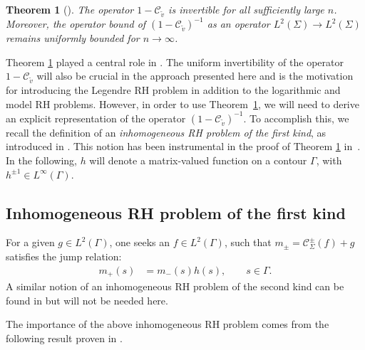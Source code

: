 \documentclass[11pt]{article}
\numberwithin{equation}{section}
\newcommand{\tv}{{\widetilde v}}
\newcommand{\Cau}{\mathcal C_{\Sigma}}
\newcommand{\Cautv}{\mathcal C_{\tv}}
\newcommand{\Ltwo}{L^2(\Sigma)}
\newtheorem{Theorem}{Theorem}[section]
\numberwithin{equation}{section}
\begin{document}
\begin{Theorem}[{\cite[Theorem 4.5]{CD}}]\label{UnifLeg}
The operator $1-\Cautv$ is invertible for all sufficiently large $n$. Moreover, the operator bound of $(1-\Cautv)^{-1}$ as an operator $\Ltwo \to \Ltwo$ remains uniformly bounded for $n \to \infty$.
\end{Theorem}
Theorem \ref{UnifLeg} played a central role in \cite{CD}. The uniform invertibility of the operator $1-\Cautv$ will also be crucial in the approach presented here and is the motivation for introducing the Legendre RH problem in addition to the logarithmic and model RH problems. However, in order to use Theorem~\ref{UnifLeg}, we will need to derive an explicit representation of the operator $(1-\Cautv)^{-1}$. To accomplish this, we recall the definition of an \emph{inhomogeneous RH problem of the first kind}, as introduced in \cite[Section~2.6]{DZSob}. This notion has been instrumental in the proof of Theorem \ref{UnifLeg} in~\cite{CD}. In the following, $h$ will denote a matrix-valued function on a contour $\Gamma$, with $h^{\pm 1} \in L^\infty(\Gamma)$.

\subsection*{Inhomogeneous RH problem of the first kind} For a given $g \in L^2(\Gamma)$, one seeks an $f \in L^2(\Gamma)$, such that $m_\pm = \Cau^\pm(f)+g$ satisfies the jump relation:
\begin{align}\label{HJump}
 m_+(s) &= m_-(s) h(s), \qquad s \in \Gamma.
\end{align}
A similar notion of an inhomogeneous RH problem of the second kind can be found in \cite[Section~2]{DZSob} but will not be needed here.

The importance of the above inhomogeneous RH problem comes from the following result proven in \cite[Proposition~2.6]{DZSob}.
\end{document}
